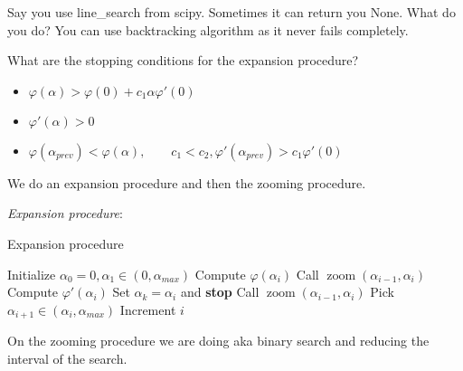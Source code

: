 \notice \; Say you use line\_search from scipy. Sometimes it can return you None. What do you do? You can use backtracking algorithm as it never fails completely.

What are the stopping conditions for the expansion procedure? 

\begin{itemize}
  \item $\varphi(\alpha) > \varphi(0) + c_1 \alpha \varphi'(0)$ 
  \item $\varphi'(\alpha) > 0$
  \item $\varphi(\alpha_{prev}) < \varphi(\alpha), \qquad c_1 < c_2, \varphi'(\alpha_{prev}) > c_1 \varphi'(0)$
\end{itemize}

We do an expansion procedure and then the zooming procedure.

\begin{definition} \textit{Expansion procedure}:
\begin{algorithm}
  \caption{Expansion procedure}
  \begin{algorithmic}[1]
  \State Initialize $\alpha_0 = 0, \alpha_1 \in (0, \alpha_{max})$
      \State Compute $\varphi(\alpha_i)$
          \State Call $\operatorname{zoom}(\alpha_{i-1}, \alpha_i)$
      \EndIf
      \State Compute $\varphi'(\alpha_i)$
          \State Set $\alpha_k = \alpha_i$ and \textbf{stop}
      \EndIf
          \State Call $\operatorname{zoom}(\alpha_{i-1}, \alpha_i)$
      \EndIf
      \State Pick $\alpha_{i+1} \in (\alpha_i, \alpha_{max})$
      \State Increment $i$
  \EndWhile
\end{algorithmic}
\end{algorithm}
\end{definition}

On the zooming procedure we are doing aka binary search and reducing the interval of the search.


